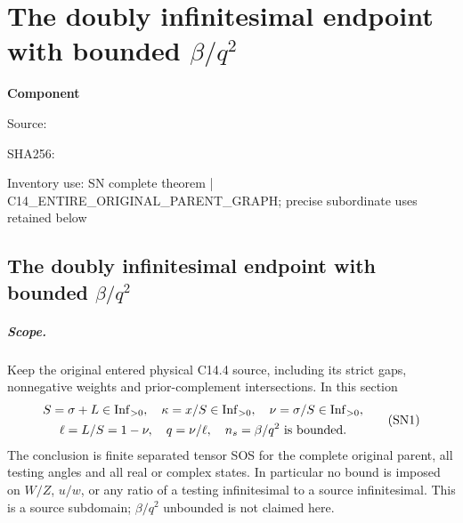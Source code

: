 \chapter{The doubly infinitesimal endpoint with bounded $\beta/q^2$}
\label{component:p1de5b12d1927}
\noindent\textbf{Component }\par
{\small\noindent Source: \par}
{\small\noindent SHA256: \par}
{\small\noindent Inventory use: SN complete theorem | C14\_\allowbreak{}ENTIRE\_\allowbreak{}ORIGINAL\_\allowbreak{}PARENT\_\allowbreak{}GRAPH; precise subordinate uses retained below\par}
\medskip
\section{The doubly infinitesimal endpoint with bounded $\beta/q^2$}
\label{p1de5b12d1927:sec:new-c144-small-nu-bounded-beta}

\paragraph{Scope.}
Keep the original entered physical C14.4 source, including its strict
gaps, nonnegative weights and prior-complement intersections. In this
section
\[
 \begin{gathered}
 S=\sigma+L\in\operatorname{Inf}_{>0},\quad
 \kappa=x/S\in\operatorname{Inf}_{>0},\quad
 \nu=\sigma/S\in\operatorname{Inf}_{>0},\\
 \ell=L/S=1-\nu,\quad q=\nu/\ell,\quad
 n_s=\beta/q^2\ \hbox{is bounded}.
 \end{gathered}
 \tag{SN1}
\]
The conclusion is finite separated tensor SOS for the complete original
parent, all testing angles and all real or complex states. In particular
no bound is imposed on $W/Z$, $u/w$, or any ratio of a testing
infinitesimal to a source infinitesimal. This is a source subdomain;
$\beta/q^2$ unbounded is not claimed here.

